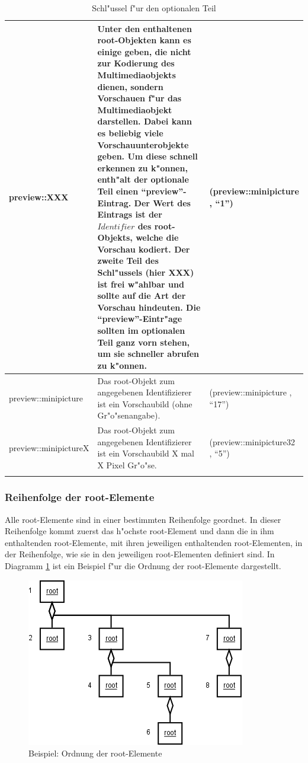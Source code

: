 \begin{small}
\begin{center}
\begin{longtable}{|p{23mm}|p{60mm}|p{40mm}|}
	preview::XXX & Unter den enthaltenen root-Objekten kann es einige geben, die nicht zur Kodierung des Multimediaobjekts dienen, sondern \textbf{Vorschauen} f"ur das Multimediaobjekt darstellen. Dabei kann es beliebig viele Vorschauunterobjekte geben. Um diese schnell erkennen zu k"onnen, enth"alt der optionale Teil einen ``preview''-Eintrag. Der Wert des Eintrags ist der $Identifier$ des root-Objekts, welche die Vorschau kodiert. Der zweite Teil des Schl"ussels (hier XXX) ist frei w"ahlbar und sollte auf die Art der Vorschau hindeuten. Die ``preview''-Eintr"age sollten im optionalen Teil ganz vorn stehen, um sie schneller abrufen zu k"onnen. & (preview::minipicture , ``1'')\\\hline
	preview::\-minipicture & Das root-Objekt zum angegebenen Identifizierer ist ein Vorschaubild (ohne Gr"o"senangabe). & (preview::minipicture , ``17'')\\\hline
	preview::\-minipictureX & Das root-Objekt zum angegebenen Identifizierer ist ein Vorschaubild X mal X Pixel Gr"o"se. & (preview::minipicture32 , ``5'')\\\hline

\caption{Schl"ussel f"ur den optionalen Teil}
\label{TableKeysOptionalpart}
\end{longtable}
\end{center}
\end{small}


\subsubsection{Reihenfolge der root-Elemente}
\label{secRootOrder}

Alle root-Elemente sind in einer bestimmten Reihenfolge geordnet. In dieser Reihenfolge kommt zuerst das h"ochste root-Element und dann die in ihm enthaltenden root-Elemente, mit ihren jeweiligen enthaltenden root-Elementen, in der Reihenfolge, wie sie in den jeweiligen root-Elementen definiert sind. In Diagramm \ref{figOrderRoot} ist ein Beispiel f"ur die Ordnung der root-Elemente dargestellt.

\begin{figure}[htbp]
\begin{center}
  \includegraphics[scale=0.4]{order_root}
\end{center}
\caption{Beispiel: Ordnung der root-Elemente}
\label{figOrderRoot}
\end{figure}

